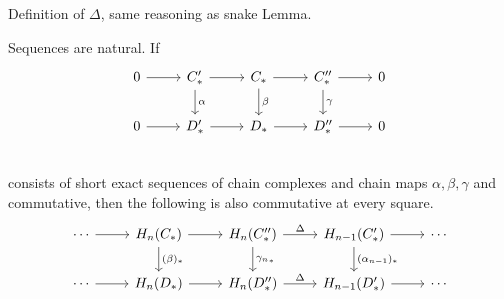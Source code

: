 Definition of $\Delta$, same reasoning as snake Lemma.


\hr

Sequences are natural.
If
\[
    \begin{tikzcd}
        0 \arrow[r, ""] & C_*' \arrow[d, "\alpha"]\arrow[r, ""] & C_* \arrow[r, ""] \arrow[d, "\beta"]& C_*'' \arrow[r, ""] \arrow[d, "\gamma"]& 0\\
        0 \arrow[r, ""] & D_*' \arrow[r, ""] & D_* \arrow[r, ""] & D_*'' \arrow[r, ""] & 0\\
    \end{tikzcd}
\]
consists of short exact sequences of chain complexes and chain maps $\alpha, \beta, \gamma$ and commutative, then the following is also commutative at every square.
\[
    \begin{tikzcd}
\cdots \arrow[r, ""] & H_n(C_*) \arrow[d, "(\beta)_*"]\arrow[r, ""] & H_n(C_*'') \arrow[d, "{\gamma_{n}}_*"]\arrow[r, "\Delta"] & H_{n-1}(C_*') \arrow[r, ""] \arrow[d, "(\alpha_{n-1})_*"]& \cdots\\
        \cdots \arrow[r, ""] & H_n(D_*) \arrow[r, ""] & H_n(D_*'') \arrow[r, "\Delta"] & H_{n-1}(D_*') \arrow[r, ""] & \cdots
    \end{tikzcd}
\]
